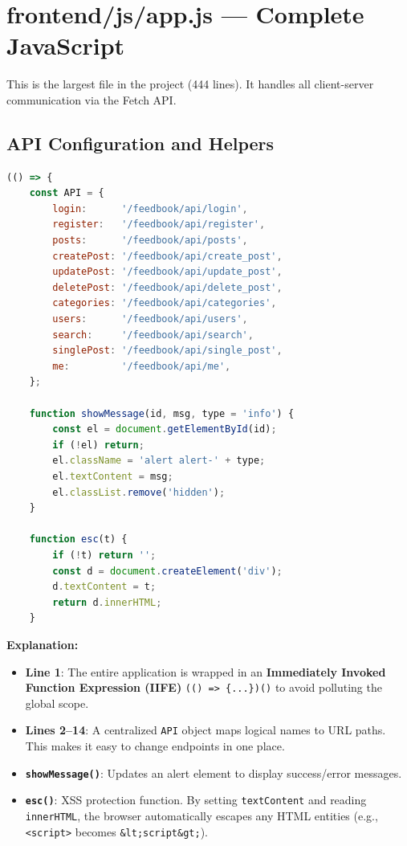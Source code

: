 \documentclass[12pt,a4paper]{report}
\begin{document}
\section{frontend/js/app.js --- Complete JavaScript}
This is the largest file in the project (444 lines). It handles all client-server communication via the Fetch API.

\subsection{API Configuration and Helpers}

\begin{lstlisting}[language=JavaScript]
(() => {
    const API = {
        login:      '/feedbook/api/login',
        register:   '/feedbook/api/register',
        posts:      '/feedbook/api/posts',
        createPost: '/feedbook/api/create_post',
        updatePost: '/feedbook/api/update_post',
        deletePost: '/feedbook/api/delete_post',
        categories: '/feedbook/api/categories',
        users:      '/feedbook/api/users',
        search:     '/feedbook/api/search',
        singlePost: '/feedbook/api/single_post',
        me:         '/feedbook/api/me',
    };

    function showMessage(id, msg, type = 'info') {
        const el = document.getElementById(id);
        if (!el) return;
        el.className = 'alert alert-' + type;
        el.textContent = msg;
        el.classList.remove('hidden');
    }

    function esc(t) {
        if (!t) return '';
        const d = document.createElement('div');
        d.textContent = t;
        return d.innerHTML;
    }
\end{lstlisting}

\textbf{Explanation:}
\begin{itemize}
    \item \textbf{Line 1}: The entire application is wrapped in an \textbf{Immediately Invoked Function Expression (IIFE)} \texttt{(() => \{...\})()} to avoid polluting the global scope.
    \item \textbf{Lines 2--14}: A centralized \texttt{API} object maps logical names to URL paths. This makes it easy to change endpoints in one place.
    \item \textbf{\texttt{showMessage()}}: Updates an alert element to display success/error messages.
    \item \textbf{\texttt{esc()}}: XSS protection function. By setting \texttt{textContent} and reading \texttt{innerHTML}, the browser automatically escapes any HTML entities (e.g., \texttt{<script>} becomes \texttt{\&lt;script\&gt;}).
\end{itemize}
\end{document}
